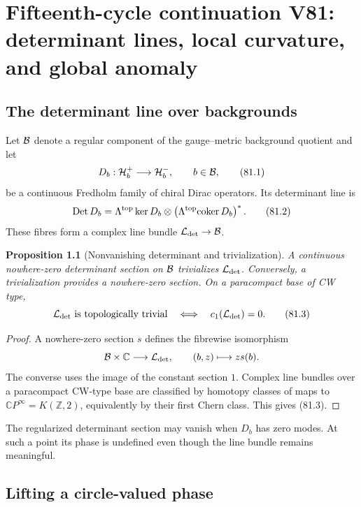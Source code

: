 \documentclass[11pt]{article}
\newtheorem{proposition}[theorem]{Proposition}
\theoremstyle{remark}
\begin{document}
\chapter{Fifteenth-cycle continuation V81: determinant lines, local curvature, and global anomaly}
\label{sec:v15v81}

\section{The determinant line over backgrounds}

Let \({\cal B}\) denote a regular component of the gauge--metric
background quotient and let
\[
 D_b:{\cal H}_b^+\longrightarrow{\cal H}_b^-,
 \qquad b\in{\cal B},                                  \tag{81.1}
\]
be a continuous Fredholm family of chiral Dirac operators.  Its
determinant line is
\[
 {\rm Det}\,D_b
 =
 \Lambda^{\rm top}\ker D_b
 \otimes
 \left(\Lambda^{\rm top}{\rm coker}\,D_b\right)^*.     \tag{81.2}
\]
These fibres form a complex line bundle
\({\cal L}_{\rm det}\to{\cal B}\).

\begin{proposition}[Nonvanishing determinant and trivialization]
\label{prop:v15v81-trivial}
A continuous nowhere-zero determinant section on \({\cal B}\)
trivializes \({\cal L}_{\rm det}\).  Conversely, a trivialization
provides a nowhere-zero section.  On a paracompact base of CW type,
\[
 {\cal L}_{\rm det}\hbox{ is topologically trivial}
 \quad\Longleftrightarrow\quad
 c_1({\cal L}_{\rm det})=0.                            \tag{81.3}
\]
\end{proposition}

\begin{proof}
A nowhere-zero section \(s\) defines the fibrewise isomorphism
\[
 {\cal B}\times{\mathbb C}\longrightarrow{\cal L}_{\rm det},
 \qquad(b,z)\longmapsto zs(b).
\]
The converse uses the image of the constant section \(1\).
Complex line bundles over a paracompact CW-type base are classified
by homotopy classes of maps to
\({\mathbb CP}^{\infty}=K({\mathbb Z},2)\), equivalently by their
first Chern class.  This gives (81.3).
\end{proof}

The regularized determinant section may vanish when \(D_b\) has
zero modes.  At such a point its phase is undefined even though the
line bundle remains meaningful.

\section{Lifting a circle-valued phase}
\end{document}
